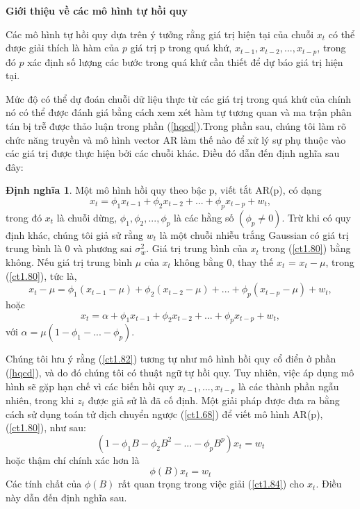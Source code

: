 \documentclass[12pt, a4paper,oneside]{book}
\theoremstyle{definition}
\newtheorem{dn}[theo]{Định nghĩa}
\begin{document}
\textbf{Giới thiệu về các mô hình tự hồi quy}

Các mô hình tự hồi quy dựa trên ý tưởng rằng giá trị hiện tại của chuỗi $x_{t}$ có thể được giải thích là hàm của $p$ giá trị p trong quá khứ, $x_{t-1}, x_{t-2}, ..., x_{t-p}$, trong đó $p$ xác định số lượng các bước trong quá khứ cần thiết để dự báo giá trị hiện tại.

Mức độ có thể dự đoán chuỗi dữ liệu thực từ các giá trị trong quá khứ của chính nó có thể được đánh giá bằng cách xem xét hàm tự tương quan và ma trận phân tán bị trễ được thảo luận trong phần (\ref{hqcd}).Trong phần sau, chúng tôi làm rõ chức năng truyền và mô hình vector AR làm thế nào để xử lý sự phụ thuộc vào các giá trị được thực hiện bởi các chuỗi khác. Điều đó dẫn đến định nghĩa sau đây:
\begin{dn}
Một mô hình hồi quy theo bậc p, viết tắt AR(p), có dạng
\begin{equation}
	x_{t} = \phi_{1}x_{t-1} + \phi_{2}x_{t-2} + ...+ \phi_{p}x_{t-p}+ w_{t}, \label{ct1.80}
\end{equation}	
trong đó $x_{t}$ là chuỗi dừng, $\phi_{1}, \phi_{2},..., \phi_{p}$ là các hằng số $(\phi_{p} \neq 0)$. Trừ khi có quy định khác, chúng tôi giả sử rằng $w_{t}$ là một chuỗi nhiễu trắng Gaussian có giá trị trung bình là 0 và phương sai $\sigma_{w}^{2}$. Giá trị trung bình của $x_{t}$ trong (\ref{ct1.80}) bằng không. Nếu giá trị trung bình $\mu$ của $x_{t}$ không bằng 0, thay thế $x_{t}$ = $x_{t} − \mu$, trong (\ref{ct1.80}), tức là,
\begin{equation}
	x_{t} − \mu= \phi_{1}(x_{t-1} - \mu) + \phi_{2}(x_{t-2}-\mu) +...+\phi_{p}(x_{t-p}- \mu) +w_{t}, \label{ct1.81}
\end{equation}
hoặc
\begin{equation}
x_{t}= \alpha + \phi_{1}x_{t-1} + \phi_{2}x_{t-2}+...+ \phi_{p}x_{t-p}+ w_{t}, \label{ct1.82}
\end{equation}
với $\alpha = \mu(1-\phi_{1}-...-\phi_{p})$.

Chúng tôi lưu ý rằng (\ref{ct1.82}) tương tự như mô hình hồi quy cổ điển ở phần (\ref{hqcd}), và do đó chúng tôi có thuật ngữ tự hồi quy. Tuy nhiên, việc áp dụng mô hình sẽ gặp hạn chế vì các biến hồi quy $x_{t-1},..., x_{t-p}$ là các thành phần ngẫu nhiên, trong khi  $z_{t}$ được giả sử là đã cố định. Một giải pháp được đưa ra bằng cách sử dụng toán tử dịch chuyển ngược (\ref{ct1.68}) để viết mô hình AR(p), (\ref{ct1.80}), như sau:
\begin{equation}
	(1-\phi_{1}B - \phi_{2}B^{2}- ...- \phi_{p}B^{p})x_{t}= w_{t} \label{ct1.83}
\end{equation}
hoặc thậm chí chính xác hơn là
\begin{equation}
\phi(B)x_{t}= w_{t} \label{ct1.84}	
\end{equation}
Các tính chất của $\phi(B)$ rất quan trọng trong việc giải (\ref{ct1.84}) cho $x_{t}$. Điều này dẫn đến định nghĩa sau.
\end{dn}
\end{document}

